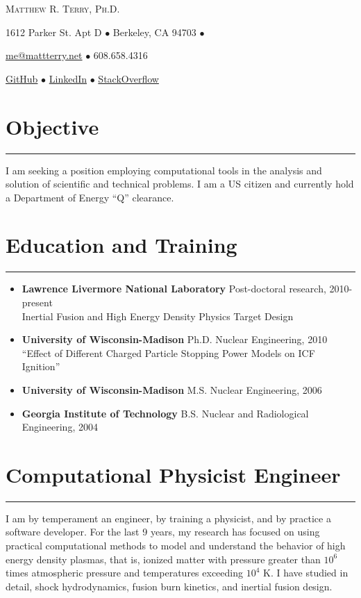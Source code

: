 \documentclass[letterpaper,11pt]{article}
\def\name{Matthew R. Terry, Ph.D.}
\newcommand{\sectionline}{\vspace{-0.05in}\hrule\vspace{0.05in}}
\begin{document}
\begin{center}
	{\huge\scshape \name}

	1612 Parker St. Apt D $\bullet$
	Berkeley, CA 94703 $\bullet$

	\href{mailto:me@mattterry.net}{me@mattterry.net}  $\bullet$
	608.658.4316

	\hyperref[https://github.com/mrterry]{GitHub}  $\bullet$
	\hyperref[http://www.linkedin.com/pub/matt-terry/a/758/61b/]{LinkedIn} $\bullet$
	\hyperref[http://careers.stackoverflow.com/cv/edit/178262]{StackOverflow}
\end{center}

\section*{Objective}
\sectionline
I am seeking a position employing computational tools in the analysis and
solution of scientific and technical problems.  I am a US citizen and currently
hold a Department of Energy ``Q'' clearance.

\section*{Education and Training}
\sectionline
\begin{itemize}
	\item
		\textbf{Lawrence Livermore National Laboratory} Post-doctoral research, 2010-present \\
		Inertial Fusion and High Energy Density Physics Target Design
	\item 
		\textbf{University of Wisconsin-Madison} Ph.D. Nuclear Engineering, 2010 \\
		``Effect of Different Charged Particle Stopping Power Models on ICF Ignition''
	\item 
		\textbf{University of Wisconsin-Madison} M.S. Nuclear Engineering, 2006
	\item 
		\textbf{Georgia Institute of Technology} B.S. Nuclear and Radiological Engineering, 2004
\end{itemize}



\section*{Computational Physicist Engineer}
\sectionline
I am by temperament an engineer, by training a physicist, and by practice a
software developer.  For the last 9 years, my research has focused on using
practical
computational methods to model and understand the behavior of high energy
density plasmas, that is, ionized matter with pressure greater than $10^6$ times atmospheric
pressure and temperatures exceeding $10^4$ K.  I have studied in detail, shock hydrodynamics,
fusion burn kinetics, and inertial fusion design.
\end{document}
